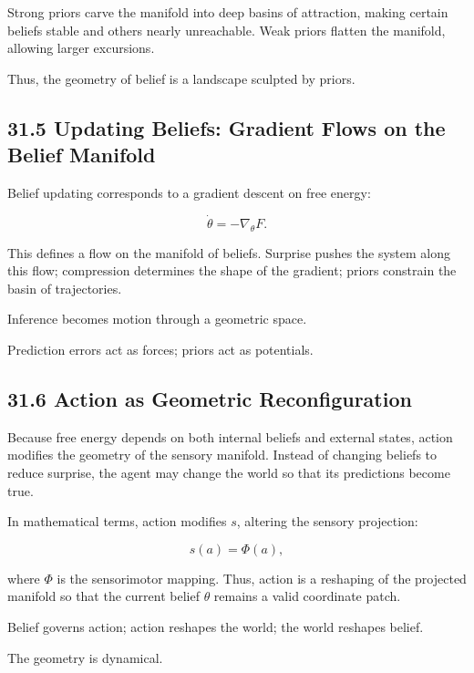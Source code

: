\documentclass[12pt,letterpaper]{article}
\theoremstyle{remark}
\begin{document}
Strong priors carve the manifold into deep basins of attraction, making certain beliefs stable and others nearly unreachable. Weak priors flatten the manifold, allowing larger excursions.

Thus, the geometry of belief is a landscape sculpted by priors.

\subsection{31.5 Updating Beliefs: Gradient Flows on the Belief Manifold}

Belief updating corresponds to a gradient descent on free energy:

\[
\dot{\theta} = -\nabla_\theta F.
\]

This defines a flow on the manifold of beliefs. Surprise pushes the system along this flow; compression determines the shape of the gradient; priors constrain the basin of trajectories.

Inference becomes motion through a geometric space.

Prediction errors act as forces; priors act as potentials.

\subsection{31.6 Action as Geometric Reconfiguration}

Because free energy depends on both internal beliefs and external states, action modifies the geometry of the sensory manifold. Instead of changing beliefs to reduce surprise, the agent may change the world so that its predictions become true.

In mathematical terms, action modifies \(s\), altering the sensory projection:

\[
s(a) = \Phi(a),
\]

where \(\Phi\) is the sensorimotor mapping. Thus, action is a reshaping of the projected manifold so that the current belief $\theta$ remains a valid coordinate patch.

Belief governs action; action reshapes the world; the world reshapes belief.

The geometry is dynamical.

\end{document}
